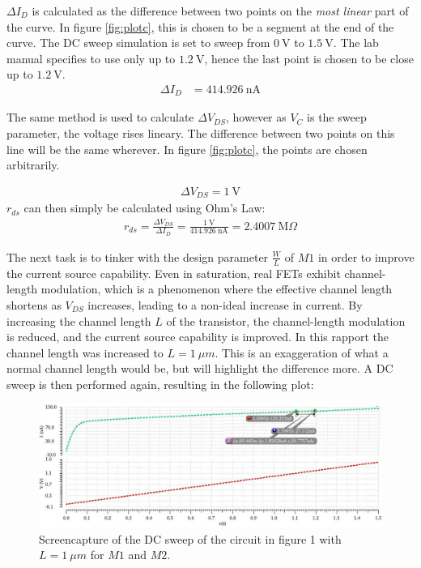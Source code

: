 \documentclass[onecolumn]{article}
\begin{document}
$\Delta I_D$ is calculated as the difference between two points on the \textit{most linear} part of the curve. In figure \ref{fig:plotc}, this is chosen to be a segment at the end of the curve. The DC sweep simulation is set to sweep from $0 \ \text{V}$ to $1.5 \ \text{V}$. The lab manual specifies to use only up to $1.2 \ \text{V}$, hence the last point is chosen to be close up to $1.2 \ \text{V}$.
\begin{align}
    \Delta I_D &= 414.926 \ \text{nA}
\end{align}

The same method is used to calculate $\Delta V_{DS}$, however as $V_C$ is the sweep parameter, the voltage rises lineary. The difference between two points on this line will be the same wherever. In figure \ref{fig:plotc}, the points are chosen arbitrarily.

\begin{align}
    \Delta V_{DS} = 1 \ \text{V}
\end{align}
$r_{ds}$ can then simply be calculated using Ohm's Law:
\begin{align}
    r_{ds} = \frac{\Delta V_{DS}}{\Delta  I_D} = \frac{ 1 \ \text{V}}{414.926 \ \text{nA}} = 2.4007 \ \text{M}\Omega
\end{align}

The next task is to tinker with the design parameter $\frac{W}{L}$ of $M1$ in order to improve the current source capability. Even in saturation, real FETs exhibit channel-length modulation, which is a phenomenon where the effective channel length shortens as $V_{DS}$ increases, leading to a non-ideal increase in current. By increasing the channel length $L$ of the transistor, the channel-length modulation is reduced, and the current source capability is improved.
In this rapport the channel length was increased to $L = 1 \ \mu m$. This is an exaggeration of what a normal channel length would be, but will highlight the difference more. A DC sweep is then performed again, resulting in the following plot: 

\begin{figure}[h!]
    \centering
    \includegraphics[width=1\textwidth]{plot_circuit_d_FINAL.png}
    \caption{Screencapture of the DC sweep of the circuit in figure 1 with $L = 1 \ \mu m$ for $M1$ and $M2$.}
    \label{fig:plotcnew}
\end{figure}
\end{document}
